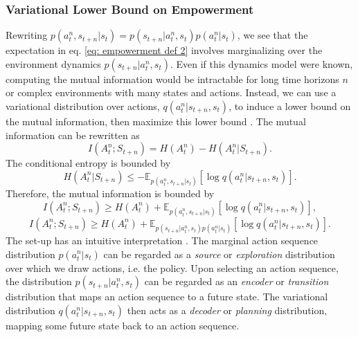 \subsubsection{Variational Lower Bound on Empowerment}
Rewriting $p(a^n_t , s_{t+n} | s_t) = p(s_{t+n} | a^n_t, s_t) p( a^n_t | s_t)$, we see that the expectation in eq. \ref{eq: empowerment def 2} involves marginalizing over the environment dynamics $p(s_{t+n} | a^n_t , s_t)$. Even if this dynamics model were known, computing the mutual information would be intractable for long time horizons $n$ or complex environments with many states and actions. Instead, we can use a variational distribution over actions, $q(a^n_t | s_{t+n}, s_t)$, to induce a lower bound on the mutual information, then maximize this lower bound \cite{barber2003algorithm}. The mutual information can be rewritten as
\begin{equation}
    I(A^n_t ; S_{t+n}) = H(A^n_t) - H(A^n_t | S_{t+n}).
\end{equation}
The conditional entropy is bounded by
\begin{equation}
    H(A^n_t | S_{t+n}) \leq - \mathbb{E}_{p(a^n_t , s_{t+n} | s_t)} \left[ \log q(a^n_t | s_{t+n}, s_t) \right].
\end{equation}
Therefore, the mutual information is bounded by
\begin{equation}
    I(A^n_t ; S_{t+n}) \geq H(A^n_t) + \mathbb{E}_{p(a^n_t , s_{t+n} | s_t)} \left[ \log q(a^n_t | s_{t+n}, s_t) \right],
\end{equation}
\begin{equation}
    I(A^n_t ; S_{t+n}) \geq H(A^n_t) + \mathbb{E}_{p(s_{t+n} | a^n_t , s_t) p(a^n_t | s_t)} \left[ \log q(a^n_t | s_{t+n}, s_t) \right].
\end{equation}
The set-up has an intuitive interpretation \cite{barber2003algorithm, mohamed2015variational}. The marginal action sequence distribution $p(a^n_t | s_t)$ can be regarded as a \textit{source} or \textit{exploration} distribution over which we draw actions, i.e. the policy. Upon selecting an action sequence, the distribution $p(s_{t+n} | a^n_t , s_t)$ can be regarded as an \textit{encoder} or \textit{transition} distribution that maps an action sequence to a future state. The variational distribution $q(a^n_t | s_{t+n}, s_t)$ then acts as a \textit{decoder} or \textit{planning} distribution, mapping some future state back to an action sequence.


